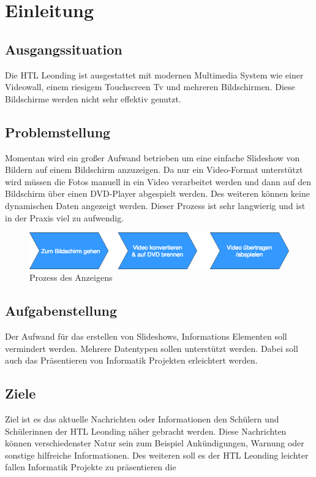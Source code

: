 \chapter{Einleitung}
\section{Ausgangssituation}
Die HTL Leonding ist ausgestattet mit modernen Multimedia System wie einer Videowall, einem riesigem Touchscreen Tv und mehreren Bildschirmen. Diese Bildschirme werden nicht sehr effektiv genutzt.

\section{Problemstellung}
Momentan wird ein großer Aufwand betrieben um eine einfache Slideshow von Bildern auf einem Bildschirm anzuzeigen. Da nur ein Video-Format unterstützt wird müssen die Fotos manuell in ein Video verarbeitet werden und dann auf den Bildschirm über einen DVD-Player abgespielt werden. Des weiteren können keine dynamischen Daten angezeigt werden. Dieser Prozess ist sehr langwierig und ist in der Praxis viel zu aufwendig.

\begin{figure}[h]
\centering
\includegraphics[width=1\textwidth]{images/01_Introduction/WayToDisplay.png}
\caption{Prozess des Anzeigens}
\label{img:processofshow}
\end{figure}

\section{Aufgabenstellung}
Der Aufwand für das erstellen von Slideshows, Informations Elementen soll vermindert werden. Mehrere Datentypen sollen unterstützt werden. Dabei soll auch das Präsentieren von Informatik Projekten erleichtert werden.

\section{Ziele}
Ziel ist es das aktuelle Nachrichten oder Informationen den Schülern und Schülerinnen der HTL Leonding näher gebracht werden. Diese Nachrichten können verschiedenster Natur sein zum Beispiel Ankündigungen, Warnung oder sonstige hilfreiche Informationen. Des weiteren soll es der HTL Leonding leichter fallen Informatik Projekte zu präsentieren die 
